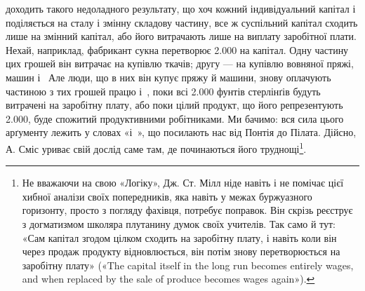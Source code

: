 доходить такого недоладного результату, що хоч кожний індивідуальний
капітал і поділяється на сталу і змінну складову
частину, все ж суспільний капітал сходить лише на змінний
капітал, або його витрачають лише на виплату заробітної плати.
Нехай, наприклад, фабрикант сукна перетворює \num{2.000}
на капітал. Одну частину цих грошей він витрачає на купівлю
ткачів; другу — на купівлю вовняної пряжі, машин і~
Але люди, що в них він купує пряжу й машини, знову оплачують
частиною з тих грошей працю і~, поки всі \num{2.000} фунтів
стерлінґів будуть витрачені на заробітну плату, або поки
цілий продукт, що його репрезентують \num{2.000},
буде спожитий продуктивними робітниками. Ми бачимо: вся
сила цього арґументу лежить у словах «і~», що посилають
нас від Понтія до Пілата. Дійсно, А. Сміс уриває свій дослід
саме там, де починаються його труднощі\footnote{
Не вважаючи на свою «Логіку», Дж. Ст. Мілл ніде навіть і не
помічає цієї хибної аналізи своїх попередників, яка навіть у межах буржуазного
горизонту, просто з погляду фахівця, потребує поправок. Він
скрізь реєструє з догматизмом школяра плутанину думок своїх учителів.
Так само й тут: «Сам капітал згодом цілком сходить на заробітну плату,
і навіть коли він через продаж продукту відновлюється, він потім знову
перетворюється на заробітну плату» («The capital itself in the long run
becomes entirely wages, and when replaced by the sale of produce becomes
wages again»).
}.

